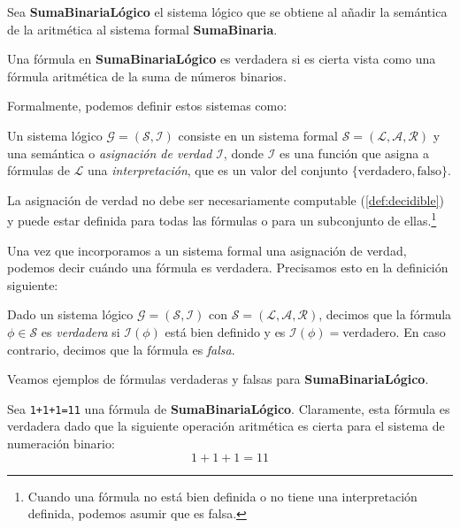 \begin{sistemalogico}\label{sl:suma-binaria-logico}
Sea \textbf{SumaBinariaLógico} el sistema lógico que se obtiene al añadir la semántica de la aritmética al sistema formal \textbf{SumaBinaria}.

Una fórmula en \textbf{SumaBinariaLógico} es verdadera si es cierta vista como una fórmula aritmética de la suma de números binarios.
\end{sistemalogico}

Formalmente, podemos definir estos sistemas como:

\begin{definicion}\label{def:sistema-logico}
Un sistema lógico $\mathcal{G} = (\mathcal{S}, \mathcal{I})$ consiste en un sistema formal $\mathcal{S}=(\mathcal{L}, \mathcal{A}, \mathcal{R})$ y una semántica o \emph{asignación de verdad} $\mathcal{I}$, donde $\mathcal{I}$ es una función que asigna a fórmulas de $\mathcal{L}$ una \emph{interpretación}, que es un valor del conjunto $\{\text{verdadero}, \text{falso}\}$.

La asignación de verdad no debe ser necesariamente computable (\cref{def:decidible}) y puede estar definida para todas las fórmulas o para un subconjunto de ellas.\footnote{Cuando una fórmula no está bien definida o no tiene una interpretación definida, podemos asumir que es falsa.}
\end{definicion}

Una vez que incorporamos a un sistema formal una asignación de verdad, podemos decir cuándo una fórmula es verdadera. Precisamos esto en la definición siguiente:

\begin{definicion}
Dado un sistema lógico $\mathcal{G}=(\mathcal{S}, \mathcal{I})$ con $\mathcal{S}=(\mathcal{L}, \mathcal{A}, \mathcal{R})$, decimos que la fórmula $\phi \in \mathcal{S}$ es \emph{verdadera} si $\mathcal{I}(\phi)$ está bien definido y es $\mathcal{I}(\phi)=\text{verdadero}$. En caso contrario, decimos que la fórmula es \emph{falsa}.
\end{definicion}

Veamos ejemplos de fórmulas verdaderas y falsas para \textbf{SumaBinariaLógico}.

\begin{ejemplo}\label{ej:suma-binaria-logico}
Sea \texttt{1+1+1=11} una fórmula de \textbf{SumaBinariaLógico}. Claramente, esta fórmula es verdadera dado que la siguiente operación aritmética es cierta para el sistema de numeración binario:
$$1+1+1=11$$
\end{ejemplo}

